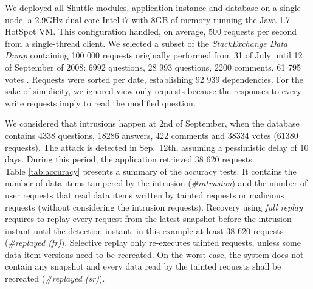 \bigskip

We deployed all Shuttle modules, application instance and database on a single node, a 2.9GHz dual-core Intel i7 with 8GB of memory running the Java 1.7 HotSpot \acf{VM}. This configuration handled, on average, 500 requests per second from a single-thread client. We selected a subset of the \textit{StackExchange Data Dump} \cite{stackexchange_data} containing 100 000 requests originally performed from 31 of July until 12 of September of 2008: 6992 questions, 28 993 questions, 2200 comments, 61 795 votes . Requests were sorted per date, establishing 92 939 dependencies. For the sake of simplicity, we ignored view-only requests because the responses to every write requests imply to read the modified question.  

We considered that intrusions happen at 2nd of September, when the database contains 4338 questions, 18286 answers, 422 comments and 38334 votes (61380 requests). The attack is detected in Sep.~12th, assuming a pessimistic delay of 10 days. During this period, the application retrieved 38 620 requests.\\

Table \ref{tab:accuracy} presents a summary of the accuracy tests. It contains the number of data items tampered by the intrusion (\emph{\#intrusion}) and the number of user requests that read data items written by  tainted requests or malicious requests (without considering the intrusion requests). Recovery using \textit{full replay} requires to replay every request from the latest snapshot before the intrusion instant until the detection instant: in this example at least 38 620 requests (\emph{\#replayed (fr)}). Selective replay only re-executes tainted requests, unless some data item versions need to be recreated. On the worst case, the system does not contain any snapshot and every data read by the tainted requests shall be recreated (\emph{\#replayed (sr)}).

